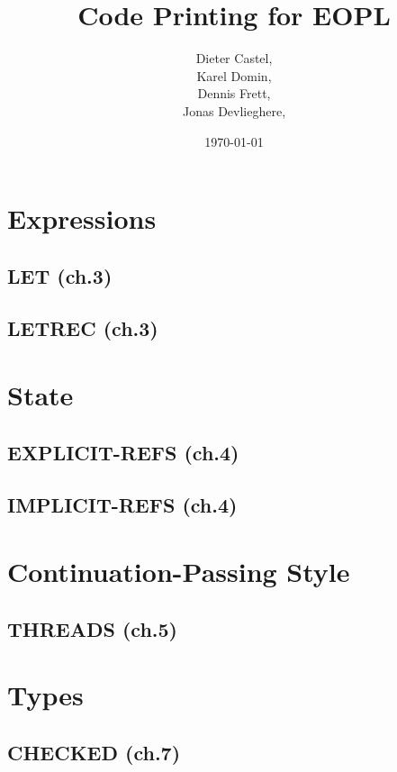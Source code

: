 \documentclass[11pt,a4paper]{book}
\title{Code Printing for EOPL}
\date{\today}
\author{Dieter Castel, \\ Karel Domin, \\ Dennis Frett, \\ Jonas Devlieghere,}
\begin{document}
\frontmatter
\maketitle
\tableofcontents

\mainmatter
\setcounter{chapter}{2}
\chapter{Expressions}

\section{LET (ch.3)}


\section{LETREC (ch.3)}


\chapter{State}

\section{EXPLICIT-REFS (ch.4)}


\section{IMPLICIT-REFS (ch.4)}


\chapter{Continuation-Passing Style}

\section{THREADS (ch.5)}


\setcounter{chapter}{6}
\chapter{Types}

\section{CHECKED (ch.7)}

\end{document}
